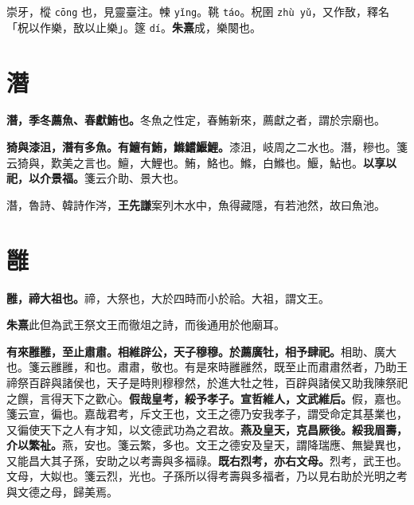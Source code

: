 \begin{quoting}崇牙，樅 \texttt{cōng} 也，見靈臺注。朄 \texttt{yǐng}。鞉 \texttt{táo}。柷圉 \texttt{zhù yǔ}，又作敔，釋名「柷以作樂，敔以止樂」。篴 \texttt{dí}。\textbf{朱熹}成，樂闋也。\end{quoting}

\section{潛}


\textbf{潛，季冬薦魚、春獻鮪也。}{\footnotesize 冬魚之性定，春鮪新來，薦獻之者，謂於宗廟也。}

\textbf{猗與漆沮，潛有多魚。有鱣有鮪，鰷鱨鰋鯉。}{\footnotesize 漆沮，岐周之二水也。潛，糝也。箋云猗與，歎美之言也。鱣，大鯉也。鮪，鮥也。鰷，白鰷也。鰋，鮎也。}\textbf{以享以祀，以介景福。}{\footnotesize 箋云介助、景大也。}

\begin{quoting}潛，魯詩、韓詩作涔，\textbf{王先謙}案列木水中，魚得藏隱，有若池然，故曰魚池。\end{quoting}

\section{雝}


\textbf{雝，禘大祖也。}{\footnotesize 禘，大祭也，大於四時而小於祫。大祖，謂文王。}

\begin{quoting}\textbf{朱熹}此但為武王祭文王而徹俎之詩，而後通用於他廟耳。\end{quoting}

\textbf{有來雝雝，至止肅肅。相維辟公，天子穆穆。於薦廣牡，相予肆祀。}{\footnotesize 相助、廣大也。箋云雝雝，和也。肅肅，敬也。有是來時雝雝然，既至止而肅肅然者，乃助王禘祭百辟與諸侯也，天子是時則穆穆然，於進大牡之牲，百辟與諸侯又助我陳祭祀之饌，言得天下之歡心。}\textbf{假哉皇考，綏予孝子。宣哲維人，文武維后。}{\footnotesize 假，嘉也。箋云宣，徧也。嘉哉君考，斥文王也，文王之德乃安我孝子，謂受命定其基業也，又徧使天下之人有才知，以文德武功為之君故。}\textbf{燕及皇天，克昌厥後。綏我眉壽，介以繁祉。}{\footnotesize 燕，安也。箋云繁，多也。文王之德安及皇天，謂降瑞應、無變異也，又能昌大其子孫，安助之以考壽與多福祿。}\textbf{既右烈考，亦右文母。}{\footnotesize 烈考，武王也。文母，大姒也。箋云烈，光也。子孫所以得考壽與多福者，乃以見右助於光明之考與文德之母，歸美焉。}

